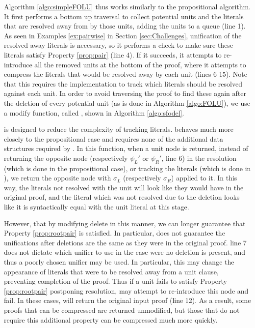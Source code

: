 Algorithm \ref{algo:simpleFOLU} thus works similarly to the propositional algorithm.  It first performs a bottom up traversal to collect potential units and the literals that are resolved away from by those units, adding the units to a queue (line 1). As seen in Examples \ref{ex:pairwise} in Section \ref{sec:Challenges}, unification of the resolved away literals is necessary, so it performs a check to make sure these literals satisfy Property \ref{prop:pair} (line 4). If it succeeds, it attempts to re-introduce all the removed units at the bottom of the proof, where it attempts to compress the literals that would be resolved away by each unit (lines 6-15). Note that this requires the implementation to track which literals should be resolved against each unit. In order to avoid traversing the proof to find these again after the deletion of every potential unit (as is done in Algorithm \ref{algo:FOLU}), we use a modify  function, called , shown in Algorithm \ref{algo:sfodel}.

 is designed to reduce the complexity of tracking literals.  behaves much more closely to the propositional case and requires none of the additional data structures required by . In this function, when a unit node is returned, instead of returning the opposite node (respectively $\psi_L'$ or $\psi_R'$, line 6) in the resolution (which is done in the propositional case), or tracking the literals (which is done in ), we return the opposite node with $\sigma_L$ (respectively $\sigma_R$) applied to it. In this way, the literals not resolved with the unit will look like they would have in the original proof, and the literal which was not resolved due to the deletion looks like it is syntactically equal with the unit literal at this stage.

However, that by modifying delete in this manner, we can longer guarantee that Property \ref{prop:rootpair} is satisfied.  In particular,  does not guarantee the unifications after deletions are the same as they were in the original proof.  line 7 does not dictate which unifier to use in the case were no deletion is present, and thus a poorly chosen unifier may be used. In particular, this may change the appearance of literals that were to be resolved away from a unit clause, preventing completion of the proof. Thus if a unit fails to satisfy Property \ref{prop:rootpair} postponing resolution, {\SFOLowerUnits} may attempt to re-introduce this node and fail. In these cases, \SFOLowerUnits will return the original input proof (line 12). As a result, some proofs that can be compressed are returned unmodified, but those that do not require this additional property can be compressed much more quickly.



